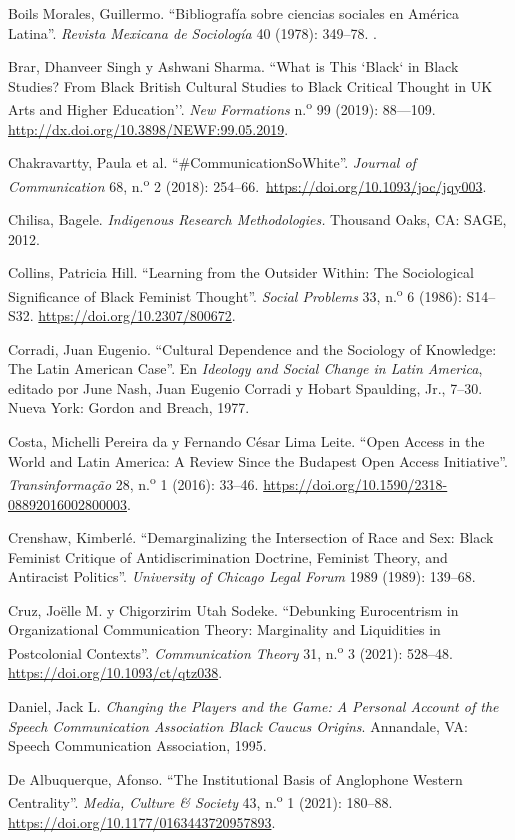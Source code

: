 \documentclass{tufte-handout}
\begin{document}
\begin{hangparas}{.25in}{1}
Boils Morales, Guillermo. ``Bibliografía sobre ciencias sociales en
América Latina''. \emph{Revista Mexicana de Sociología} 40 (1978):
349--78. .

Brar, Dhanveer Singh y Ashwani Sharma. ``What is This `Black` in Black
Studies? From Black British Cultural Studies to Black Critical Thought
in UK Arts and Higher Education''. \emph{New Formations}
n.\textsuperscript{o} 99 (2019): 88---109.
\url{http://dx.doi.org/10.3898/NEWF:99.05.2019}.

Chakravartty, Paula et al. ``\#CommunicationSoWhite''. \emph{Journal of
Communication} 68, n.\textsuperscript{o} 2 (2018):
254--66.~\url{https://doi.org/10.1093/joc/jqy003}.

Chilisa, Bagele. \emph{Indigenous Research Methodologies.} Thousand
Oaks, CA: SAGE, 2012.

Collins, Patricia Hill. ``Learning from the Outsider Within: The
Sociological Significance of Black Feminist Thought''. \emph{Social
Problems} 33, n.\textsuperscript{o} 6 (1986): S14--S32.
\url{https://doi.org/10.2307/800672}.

Corradi, Juan Eugenio. ``Cultural Dependence and the Sociology of
Knowledge: The Latin American Case''. En \emph{Ideology and Social
Change in Latin America}, editado por June Nash, Juan Eugenio Corradi y
Hobart Spaulding, Jr., 7--30. Nueva York: Gordon and Breach, 1977.

Costa, Michelli Pereira da y Fernando César Lima Leite. ``Open Access in
the World and Latin America: A Review Since the Budapest Open Access
Initiative''. \emph{Transinformação} 28, n.\textsuperscript{o} 1 (2016):
33--46. \url{https://doi.org/10.1590/2318-08892016002800003}.

Crenshaw, Kimberlé. ``Demarginalizing the Intersection of Race and Sex:
Black Feminist Critique of Antidiscrimination Doctrine, Feminist Theory,
and Antiracist Politics''. \emph{University of Chicago Legal Forum} 1989
(1989): 139--68.

Cruz, Joëlle M. y Chigorzirim Utah Sodeke. ``Debunking Eurocentrism in
Organizational Communication Theory: Marginality and Liquidities in
Postcolonial Contexts''. \emph{Communication Theory} 31,
n.\textsuperscript{o} 3 (2021): 528--48.
\url{https://doi.org/10.1093/ct/qtz038}.

Daniel, Jack L. \emph{Changing the Players and the Game: A Personal
Account of the Speech Communication Association Black Caucus Origins}.
Annandale, VA: Speech Communication Association, 1995.

De Albuquerque, Afonso. ``The Institutional Basis of Anglophone Western
Centrality''. \emph{Media, Culture \& Society} 43, n.\textsuperscript{o}
1 (2021): 180--88. \url{https://doi.org/10.1177/0163443720957893}.


\end{hangparas}
\end{document}
